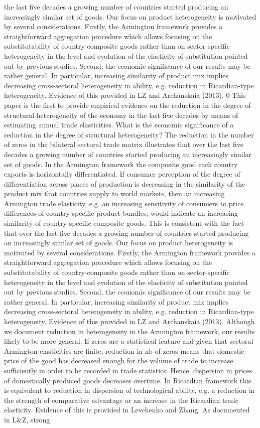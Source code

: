\documentclass[12pt,twoside,a4paper,notitlepage]{article}
\begin{document}
the last five decades a growing number of countries started producing an increasingly similar set of goods. Our focus on product heterogeneity is motivated by several considerations. Firstly, the Armington framework provides a straightforward aggregation procedure which allows focusing on the substitutability of country-composite goods rather than on sector-specific heterogeneity in the level and evolution of the elasticity of substitution pointed out by previous studies. Second, the economic significance of our results may be rather general. In particular, increasing similarity of product mix implies decreasing cross-sectoral heterogeneity in ability, e.g. reduction in Ricardian-type heterogeneity. Evidence of this provided in LZ and Archanskaia (2013). 0 This paper is the first to provide empirical evidence on the reduction in the degree of structural heterogeneity of the economy in the last five decades by means of estimating annual trade elasticities. What is the economic significance of a reduction in the degree of structural heterogeneity? The reduction in the number of zeros in the bilateral sectoral trade matrix illustrates that over the last five decades a growing number of countries started producing an increasingly similar set of goods. In the Armington framework the composite good each country exports is horizontally differentiated. If consumer perception of the degree of differentiation across places of production is decreasing in the similarity of the product mix that countries supply to world markets, then an increasing Armington trade elasticity, e.g. an increasing sensitivity of consumers to price differences of country-specific product bundles, would indicate an increasing similarity of country-specific composite goods. This is consistent with the fact that over the last five decades a growing number of countries started producing an increasingly similar set of goods. Our focus on product heterogeneity is motivated by several considerations. Firstly, the Armington framework provides a straightforward aggregation procedure which allows focusing on the substitutability of country-composite goods rather than on sector-specific heterogeneity in the level and evolution of the elasticity of substitution pointed out by previous studies. Second, the economic significance of our results may be rather general. In particular, increasing similarity of product mix implies decreasing cross-sectoral heterogeneity in ability, e.g. reduction in Ricardian-type heterogeneity. Evidence of this provided in LZ and Archanskaia (2013). Although we document reduction in heterogeneity in the Armington framework, our results likely to be more general. If zeros are a statistical feature and given that sectoral Armington elasticities are finite, reduction in nb of zeros means that domestic price of the good has decreased enough for the volume of trade to increase sufficiently in order to be recorded in trade statistics. Hence, dispersion in prices of domestically produced goods decreases overtime. In Ricardian framework this is equivalent to reduction in dispersion of technological ability, e.g. a reduction in the strength of comparative advantage or an increase in the Ricardian trade elasticity. Evidence of this is provided in Levchenko and Zhang. As documented in L\&Z, strong 
\end{document}
